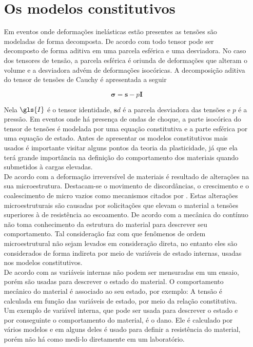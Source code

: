 \chapter{Os modelos constitutivos} \label{Cap: ModConst}

Em eventos onde deformações inelásticas estão presentes as tensões são modeladas de forma decomposta. De acordo com \cite{Holzapfel} todo tensor pode ser decomposto de forma aditiva em uma parcela esférica e uma desviadora. No caso dos tensores de tensão, a parcela esférica é oriunda de deformações que alteram o volume e a desviadora advém de deformações isocóricas. A decomposição aditiva do tensor de tensões de Cauchy é apresentada a seguir

\begin{equation} 
    \boldsymbol{\sigma} = \boldsymbol{s} - p\boldsymbol{I}
\end{equation}

Nela $ \gls{I} $ é o tensor identidade, $\boldsymbol{s}d$ é a parcela desviadora das tensões e $p$ é a pressão. Em eventos onde há presença de ondas de choque, a parte isocórica do tensor de tensões é modelada por uma equação constitutiva e a parte esférica por uma equação de estado. Antes de apresentar os modelos constitutivos mais usados é importante visitar alguns pontos da teoria da plasticidade, já que ela terá grande importância na definição do comportamento dos materiais quando submetidos à cargas elevadas. \\

De acordo com \cite{hiermaier_2008} a deformação irreversível de materiais é resultado de alterações na sua microestrutura. Destacam-se o movimento de discordâncias, o crescimento e o coalescimento de micro vazios como mecanismos citados por \cite{hiermaier_2008}. Estas alterações microestruturais são causadas por solicitações que elevam o material a tensões superiores à de resistência ao escoamento. De acordo com \cite{tadmor_miller_elliott_2012} a mecânica do contínuo não toma conhecimento da estrutura do material para descrever seu comportamento. Tal consideração faz com que fenômenos de ordem microestrutural não sejam levados em consideração direta, no entanto eles são considerados de forma indireta por meio de variáveis de estado internas, usadas nos modelos constitutivos. \\

De acordo com \cite{Holzapfel} as variáveis internas não podem ser mensuradas em um ensaio, porém são usadas para descrever o estado do material. O comportamento mecânico do material é associado ao seu estado, por exemplo: A tensão é calculada em função das variáveis de estado, por meio da relação constitutiva. Um exemplo de variável interna, que pode ser usada para descrever o estado e por conseguinte o comportamento do material, é o dano. Ele é calculado por vários modelos e em alguns deles é usado para definir a resistência do material, porém não há como medi-lo diretamente em um laboratório. \\

